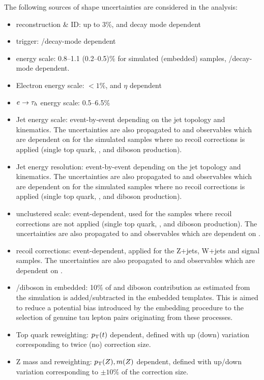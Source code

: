The following sources of shape uncertainties are considered in the analysis:
\begin{itemize}
    \item \tauh reconstruction \& ID: up to 3\%, \pt and decay mode dependent
    \item \tauh trigger: \pt/decay-mode dependent
    \item \tauh energy scale: 0.8–1.1 (0.2–0.5)\% for simulated (embedded) samples, \pt/decay-mode dependent.
    \item Electron energy scale: $<1\%$, \pt and $\eta$ dependent
    \item $e\to \tau_h$ energy scale: 0.5–6.5\%
    \item Jet energy scale: event-by-event depending on the jet topology and kinematics. The uncertainties are also propagated to \met and observables which are dependent on \met for the simulated samples where no recoil corrections is applied (single top quark, \ttbar, and diboson production). 
    \item Jet energy resolution: event-by-event depending on the jet topology and kinematics. The uncertainties are also propagated to \met and observables which are dependent on \met for the simulated samples where no recoil corrections is applied (single top quark, \ttbar, and diboson production).  
    \item \met unclustered scale: event-dependent, used for the samples where recoil corrections are not applied (single top quark, \ttbar, and diboson production). The uncertainties are also propagated to \met and observables which are dependent on \met.
    \item \met recoil corrections: event-dependent, applied for the Z+jets, W+jets and signal samples. The uncertainties are also propagated to \met and observables which are dependent on \met.
    \item \ttbar/diboson in embedded: 10\% of \ttbar and diboson contribution as estimated from the simulation is added/subtracted in the embedded templates. This is aimed to reduce a potential bias introduced by the embedding procedure to the selection of genuine tau lepton pairs originating from these processes.
    \item Top quark \pt reweighting: $p_{\text{T}}(t)$ dependent, defined with up (down) variation corresponding to twice (no) correction size.
    \item Z mass and \pt reweighting: $p_{\text{T}}(Z), m(Z)$ dependent, defined with up/down variation corresponding to $\pm10\%$ of the correction size.

\end{itemize}
